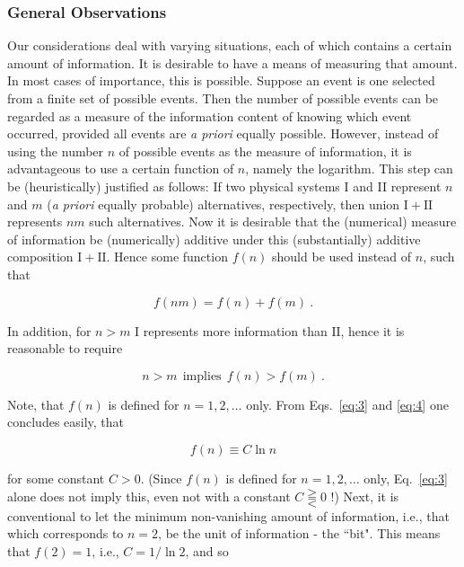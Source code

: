\documentclass[twocolumn,preprintnumbers,amsmath,amssymb,floatfix]{revtex4}
\begin{document}
\subsubsection{\label{sec:five2_1}General Observations} Our
considerations deal with varying situations, each of which
contains a certain amount of information. It is desirable to have
a means of measuring that amount. In most cases of importance,
this is possible. Suppose an event is one selected from a finite
set of possible events. Then the number of possible events can be
regarded as a measure of the information content of knowing which
event occurred, provided all events are \textit{a priori} equally
possible. However, instead of using the number $n$ of possible
events as the measure of information, it is advantageous to use a
certain function of $n$, namely the logarithm. This step can be
(heuristically) justified as follows: If two physical systems I
and II represent $n$ and $m$ (\textit{a priori} equally probable)
alternatives, respectively, then union $\mathrm{I}+\mathrm{II}$
represents $nm$ such alternatives. Now it is desirable that the
(numerical) measure of information be (numerically) additive under
this (substantially) additive composition
$\mathrm{I}+\mathrm{II}$. Hence some function $f(n)$ should be
used instead of $n$, such that

\begin{equation}
f(nm)=f(n) + f(m)~. \label{eq:3}
\end{equation}

\noindent In addition, for $n>m$ $\mathrm{I}$ represents more
information than $\mathrm{II}$, hence it is reasonable to require

\begin{equation}
n>m ~~ \mathrm{implies} ~~ f(n) > f(m)~. \label{eq:4}
\end{equation}

\noindent Note, that $f(n)$ is defined for $n=1,2,\ldots$ only.
From Eqs.~\ref{eq:3} and \ref{eq:4} one concludes easily, that

\begin{equation}
f(n)\equiv C\ln{n}\label{eq:5}
\end{equation}

\noindent for some constant $C>0$. (Since $f(n)$ is defined for
$n=1,2,\ldots$ only, Eq.~\ref{eq:3} alone does not imply this,
even not with a constant $C \gtreqqless 0$ !) Next, it is
conventional to let the minimum non-vanishing amount of
information, i.e., that which corresponds to $n=2$, be the unit of
information - the ``bit". This means that $f(2)=1$, i.e.,
$C=1/\ln{2}$, and so
\end{document}
